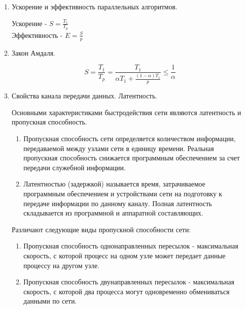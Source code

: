 \documentclass[a4paper]{article}
\begin{document}
\begin{enumerate}

\item Ускорение и эффективность параллельных алгоритмов. \par
 	Ускорение - $S= \frac{T_1}{T_p}$ \\
	Эффективность - $E=\frac{S}{p}$ 
\item Закон Амдаля. \par
$$S=\frac{T_1}{T_p}=\frac{T_1}{\alpha T_1 + \frac{(1-\alpha)T_1}{p}} \leq \frac{1}{\alpha}$$
\item Свойства канала передачи данных. Латентность. \par
Основными характеристиками быстродействия сети являются латентность и пропускная способность. 
\begin{enumerate}
	\item Пропускная способность сети определяется количеством информации, 
	передаваемой между узлами сети в единицу времени. Реальная пропускная способность снижается программным обеспечением за счет передачи служебной информации.
	\item Латентностью (задержкой) называется время, затрачиваемое программным обеспечением
	 и устройствами сети на подготовку к передаче информации по данному каналу.
	  Полная латентность складывается из программной и аппаратной составляющих.
\end{enumerate}

Различают следующие виды пропускной способности сети:
\begin{enumerate}
	\item Пропускная способность однонаправленных пересылок -  максимальная скорость, с которой процесс на одном узле может передает данные процессу на другом узле.

	\item Пропускная способность двунаправленных пересылок -  максимальная скорость, с которой два процесса могут одновременно обмениваться данными по сети.

\end{enumerate}



\end{enumerate}
\end{document}
